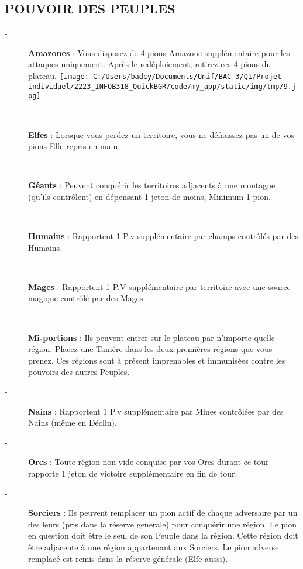 \documentclass{scrartcl}%
\begin{document}
\subsection{ POUVOIR DES PEUPLES
}%
\label{subsec:POUVOIRDESPEUPLES}%
\begin{description}%
\item[{-} ]%
%
\textcolor{mygreen}{%
\textbf{Amazones}%
}%
\textit{ }%
 : Vous disposez de 4 pions Amazone supplémentaire pour les attaques uniquement. Après le redéploiement, retirez ces 4 pions du plateau.%
\texttt{[image: C:/Users/badcy/Documents/Unif/BAC 3/Q1/Projet individuel/2223\_INFOB318\_QuickBGR/code/my\_app/static/img/tmp/9.jpg]}%

%

%
\item[{-} ]%
%
\textcolor{mygreen}{%
\textbf{Elfes}%
}%
\textit{ }%
 : Lorsque vous perdez un territoire, vous ne défaussez pas un de vos pions Elfe repris en main.
%
\item[{-} ]%
%
\textcolor{mygreen}{%
\textbf{Géants}%
}%
\textit{ }%
 : Peuvent conquérir les territoires adjacents à une montagne (qu'ils contrôlent) en dépensant 1 jeton de moins, Minimum 1 pion.
%
\item[{-} ]%
%
\textcolor{mygreen}{%
\textbf{Humains}%
}%
\textit{ }%
 : Rapportent 1 P.v supplémentaire par champs contrôlés par des Humains.
%
\item[{-} ]%
%
\textcolor{mygreen}{%
\textbf{Mages}%
}%
\textit{ }%
 : Rapportent 1 P.V supplémentaire par territoire avec une source magique contrôlé par des Mages.
%
\item[{-} ]%
%
\textcolor{mygreen}{%
\textbf{Mi{-}portions}%
}%
\textit{ }%
 : Ils peuvent entrer sur le plateau par n'importe quelle région. Placez une Tanière dans les deux premières régions que vous prenez. Ces régions sont à présent imprenables et immunisées contre les pouvoirs des autres Peuples.
%
\item[{-} ]%
%
\textcolor{mygreen}{%
\textbf{Nains}%
}%
\textit{ }%
 : Rapportent 1 P.v supplémentaire par Mines contrôlées par des Nains (même en Déclin).
%
\item[{-} ]%
%
\textcolor{mygreen}{%
\textbf{Orcs}%
}%
\textit{ }%
 : Toute région non{-}vide conquise par vos Orcs durant ce tour rapporte 1 jeton de victoire supplémentaire en fin de tour.
%
\item[{-} ]%
%
\textcolor{mygreen}{%
\textbf{Sorciers}%
}%
\textit{ }%
 : Ils peuvent remplacer un pion actif de chaque adversaire par un des leurs (pris dans la réserve generale) pour conquérir une région. Le pion en question doit être le seul de son Peuple dans la région. Cette région doit être adjacente à une région appartenant aux Sorciers. Le pion adverse remplacé est remis dans la réserve générale (Elfe aussi).

\end{description}
\end{document}
